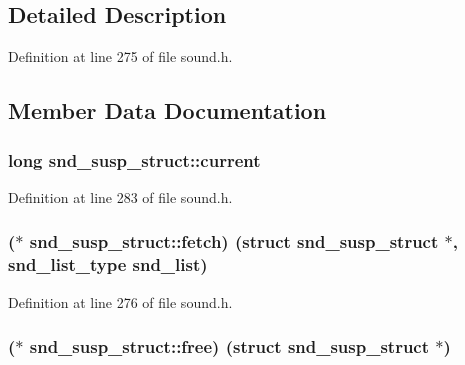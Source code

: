 \subsection{Detailed Description}


Definition at line 275 of file sound.\+h.



\subsection{Member Data Documentation}
\subsubsection[{\texorpdfstring{current}{current}}]{\setlength{\rightskip}{0pt plus 5cm}long snd\+\_\+susp\+\_\+struct\+::current}\hypertarget{structsnd__susp__struct_a8f9e3b02c2fc0ccbb63d88b97d44c89c}{}\label{structsnd__susp__struct_a8f9e3b02c2fc0ccbb63d88b97d44c89c}


Definition at line 283 of file sound.\+h.

\subsubsection[{\texorpdfstring{fetch}{fetch}}]{($\ast$ snd\+\_\+susp\+\_\+struct\+::fetch) (struct {\bf snd\+\_\+susp\+\_\+struct} $\ast$, {\bf snd\+\_\+list\+\_\+type} snd\+\_\+list)}\hypertarget{structsnd__susp__struct_addb182d5c03b9b8f864e4fd9871f7722}{}\label{structsnd__susp__struct_addb182d5c03b9b8f864e4fd9871f7722}


Definition at line 276 of file sound.\+h.

\subsubsection[{\texorpdfstring{free}{free}}]{($\ast$ snd\+\_\+susp\+\_\+struct\+::free) (struct {\bf snd\+\_\+susp\+\_\+struct} $\ast$)}\hypertarget{structsnd__susp__struct_a39cc18ad890efb4f088c9d7636e3b5c0}{}\label{structsnd__susp__struct_a39cc18ad890efb4f088c9d7636e3b5c0}



